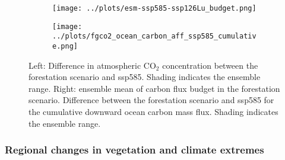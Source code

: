 \documentclass[]{article}
\begin{document}
\begin{figure}[H]
    \centering
    \begin{subfigure}[b]{0.4\linewidth}
        \texttt{[image: ../plots/esm-ssp585-ssp126Lu\_budget.png]}
    \end{subfigure}
    \begin{subfigure}[b]{0.4\linewidth}
        \texttt{[image: ../plots/fgco2\_ocean\_carbon\_aff\_ssp585\_cumulative.png]}
    \end{subfigure}
    \caption{Left: Difference in atmospheric CO$_2$ concentration between the forestation scenario and ssp585. Shading indicates the ensemble range. Right: ensemble mean of carbon flux budget in the forestation scenario. Difference between the forestation scenario and ssp585 for the cumulative downward ocean carbon mass flux. Shading indicates the ensemble range.}
    \label{fig:global_carbon_budget}
\end{figure}


\subsubsection{Regional changes in vegetation and climate extremes}
\end{document}
